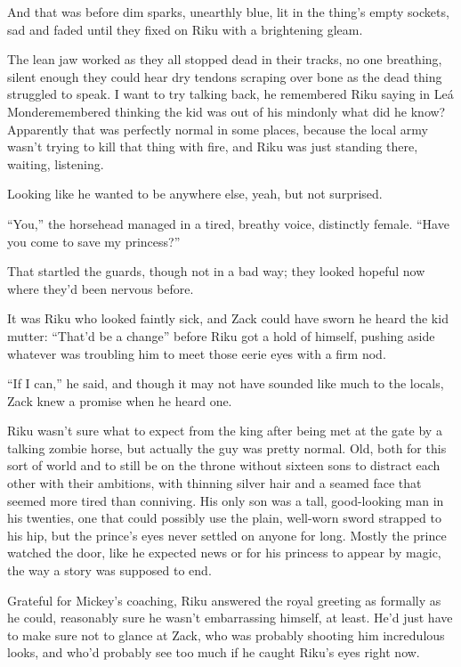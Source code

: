 And that was before dim sparks, unearthly blue, lit in the thing's empty sockets, sad and faded until they fixed on Riku with a brightening gleam.

The lean jaw worked as they all stopped dead in their tracks, no one breathing, silent enough they could hear dry tendons scraping over bone as the dead thing struggled to speak. I want to try talking back, he remembered Riku saying in Leá Monde\textemdash remembered thinking the kid was out of his mind\textemdash only what did he know? Apparently that was perfectly normal in some places, because the local army wasn't trying to kill that thing with fire, and Riku was just standing there, waiting, listening.

Looking like he wanted to be anywhere else, yeah, but not surprised.

``You,'' the horsehead managed in a tired, breathy voice, distinctly female. ``Have you come to save my princess?''

That startled the guards, though not in a bad way; they looked hopeful now where they'd been nervous before.

It was Riku who looked faintly sick, and Zack could have sworn he heard the kid mutter: ``That'd be a change'' before Riku got a hold of himself, pushing aside whatever was troubling him to meet those eerie eyes with a firm nod.

``If I can,'' he said, and though it may not have sounded like much to the locals, Zack knew a promise when he heard one.


\scenechange


Riku wasn't sure what to expect from the king after being met at the gate by a talking zombie horse, but actually the guy was pretty normal. Old, both for this sort of world and to still be on the throne without sixteen sons to distract each other with their ambitions, with thinning silver hair and a seamed face that seemed more tired than conniving. His only son was a tall, good-looking man in his twenties, one that could possibly use the plain, well-worn sword strapped to his hip, but the prince's eyes never settled on anyone for long. Mostly the prince watched the door, like he expected news or for his princess to appear by magic, the way a story was supposed to end.

Grateful for Mickey's coaching, Riku answered the royal greeting as formally as he could, reasonably sure he wasn't embarrassing himself, at least. He'd just have to make sure not to glance at Zack, who was probably shooting him incredulous looks, and who'd probably see too much if he caught Riku's eyes right now.

